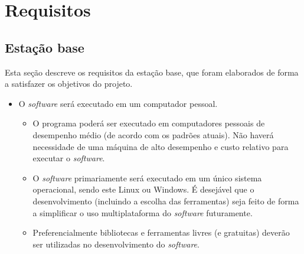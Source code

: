 \section{Requisitos}

\subsection{Estação base}
\label{subsec:req_estacao-base}
%
Esta seção descreve os requisitos da estação base, que foram elaborados de forma a satisfazer os objetivos do projeto.

\begin{itemize} %

  \item O \textit{software} será executado em um computador pessoal.
    \begin{itemize}
      \item O programa poderá ser executado em computadores pessoais de desempenho médio (de acordo com os padrões atuais). Não haverá necessidade de uma máquina de alto desempenho e custo relativo para executar o \textit{software}. %
      \item O \textit{software} primariamente será executado em um único sistema operacional, sendo este Linux ou Windows. É desejável que o desenvolvimento (incluindo a escolha das ferramentas) seja feito de forma a simplificar o uso multiplataforma do \textit{software} futuramente. 
      \item Preferencialmente bibliotecas e ferramentas livres (e gratuitas) deverão ser utilizadas no desenvolvimento do \textit{software}.
    \end{itemize}


\end{itemize}
